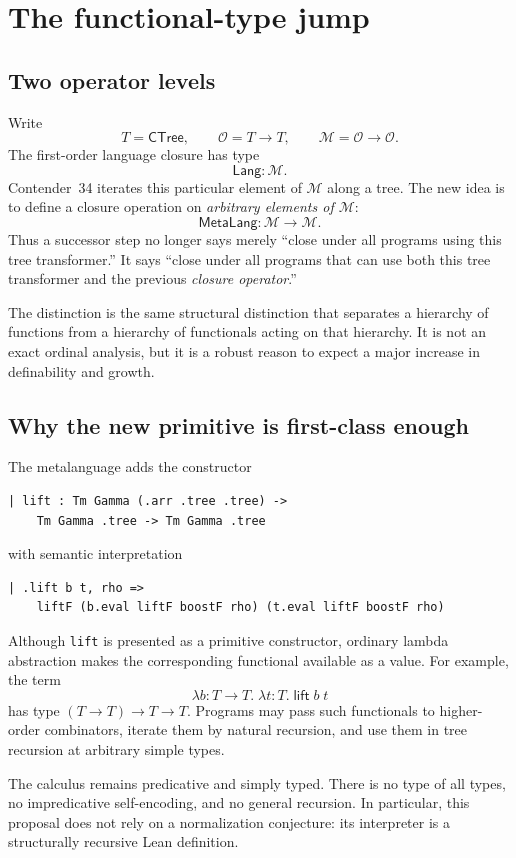 \documentclass[11pt]{article}
\theoremstyle{definition}
\newcommand{\CTree}{\mathsf{CTree}}
\newcommand{\Op}{\mathcal{O}}
\newcommand{\MOp}{\mathcal{M}}
\newcommand{\Lang}{\mathsf{Lang}}
\newcommand{\MetaLang}{\mathsf{MetaLang}}
\newcommand{\code}[1]{\texttt{#1}}
\begin{document}
\section{The functional-type jump}

\subsection{Two operator levels}

Write
\[
  T = \CTree,
  \qquad
  \Op = T\to T,
  \qquad
  \MOp = \Op\to\Op.
\]
The first-order language closure has type
\[
  \Lang : \MOp.
\]
Contender~34 iterates this particular element of \(\MOp\) along a tree.  The
new idea is to define a closure operation on \emph{arbitrary elements of
\(\MOp\)}:
\[
  \MetaLang : \MOp\to\MOp.
\]
Thus a successor step no longer says merely ``close under all programs using
this tree transformer.''  It says ``close under all programs that can use both
this tree transformer and the previous \emph{closure operator}.''

The distinction is the same structural distinction that separates a hierarchy
of functions from a hierarchy of functionals acting on that hierarchy.  It is
not an exact ordinal analysis, but it is a robust reason to expect a major
increase in definability and growth.

\subsection{Why the new primitive is first-class enough}

The metalanguage adds the constructor
\begin{lstlisting}
| lift : Tm Gamma (.arr .tree .tree) ->
    Tm Gamma .tree -> Tm Gamma .tree
\end{lstlisting}
with semantic interpretation
\begin{lstlisting}
| .lift b t, rho =>
    liftF (b.eval liftF boostF rho) (t.eval liftF boostF rho)
\end{lstlisting}
Although \code{lift} is presented as a primitive constructor, ordinary lambda
abstraction makes the corresponding functional available as a value.  For
example, the term
\[
  \lambda b:T\to T.\;\lambda t:T.\;\mathsf{lift}\;b\;t
\]
has type \((T\to T)\to T\to T\).  Programs may pass such functionals to
higher-order combinators, iterate them by natural recursion, and use them in
tree recursion at arbitrary simple types.

The calculus remains predicative and simply typed.  There is no type of all
types, no impredicative self-encoding, and no general recursion.  In
particular, this proposal does not rely on a normalization conjecture: its
interpreter is a structurally recursive Lean definition.
\end{document}
